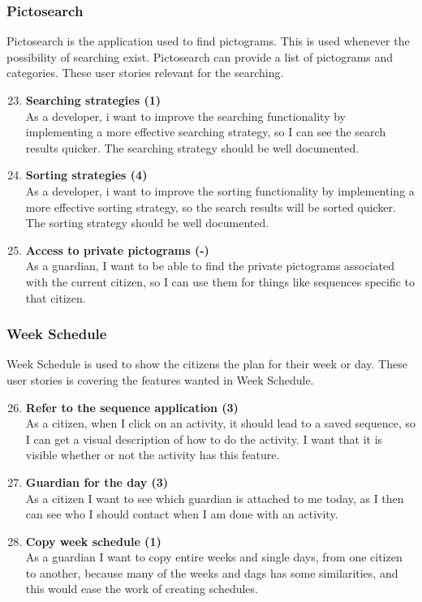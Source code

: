 \subsubsection{Pictosearch}
Pictosearch is the application used to find pictograms. This is used whenever the possibility of searching exist. Pictosearch can provide a list of pictograms and categories. These user stories relevant for the searching.

\begin{enumerate}
	\setcounter{enumi}{22} %
	\item \textbf{Searching strategies (1)}\\
	As a developer, i want to improve the searching functionality by implementing a more effective searching strategy, so I can see the search results quicker. The searching strategy should be well documented.
	
	\item \textbf{Sorting strategies (4)}\\
	As a developer, i want to improve the sorting functionality by implementing a more effective sorting strategy, so the search results will be sorted quicker. The sorting strategy should be well documented.
	
	\item \textbf{Access to private pictograms (-)}\\
	As a guardian, I want to be able to find the private pictograms associated with the current citizen, so I can use them for things like sequences specific to that citizen.
\end{enumerate}

\subsubsection{Week Schedule}
Week Schedule is used to show the citizens the plan for their week or day. These user stories is covering the features wanted in Week Schedule.

\begin{enumerate}
	\setcounter{enumi}{25} %
	\item \textbf{Refer to the sequence application (3)}\\
	As a citizen, when I click on an activity, it should lead to a saved sequence, so I can get a visual description of how to do the activity. I want that it is visible whether or not the activity has this feature.
	
	\item \textbf{Guardian for the day (3) }\\
	As a citizen I want to see which guardian is attached to me today, as I then can see who I should contact when I am done with an activity. 
	
	\item \textbf{Copy week schedule (1) }\\
	As a guardian I want to copy entire weeks and single days, from one citizen to another, because many of the weeks and dags has some similarities, and this would ease the work of creating schedules. 
\end{enumerate}

